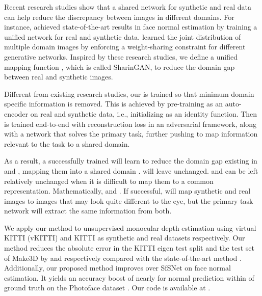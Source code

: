 \documentclass[10pt,twocolumn,letterpaper]{article}
\newcommand{\MYhref}[3][blue]{\href{#2}{\color{#1}{#3}}}
\begin{document}
Recent research studies show that a shared network for synthetic and real data can help reduce the discrepancy between images in different domains.
For instance, \cite{SfSNet} achieved state-of-the-art results in face normal estimation by training a unified network for real and synthetic data. 
\cite{CoGAN} learned the joint distribution of multiple domain images by enforcing a weight-sharing constraint for different generative networks.
Inspired by these research studies, we define a unified mapping function , which is called SharinGAN, to reduce the domain gap between real and synthetic images.


Different from existing research studies, our  is trained so that minimum domain specific information is removed.
This is achieved by pre-training  as an auto-encoder on real and synthetic data, i.e., initializing  as an identity function. Then  is trained end-to-end with reconstruction loss in an adversarial framework, along with a network that solves the primary task, further pushing  to map information relevant to the task to a shared domain.



As a result, a successfully trained  will learn to reduce the domain gap existing in  and , mapping them into a shared domain .   will leave  unchanged.    and  can be left relatively unchanged when it is difficult to map them to a common representation.
Mathematically,  and . If successful,  will map synthetic and real images to images that may look quite different to the eye, but the primary task network will extract the same information from both.






















We apply our method to unsupervised monocular depth estimation using virtual KITTI (vKITTI) \cite{vKITTI} and KITTI \cite{KITTI} as synthetic and real datasets respectively.
Our method reduces the absolute error in the KITTI eigen test split and the test set of Make3D \cite{make3D} by  and  respectively compared with the state-of-the-art method \cite{GASDA}.
Additionally, our proposed method improves over SfSNet \cite{SfSNet} on face normal estimation.  It yields an accuracy boost of nearly  for normal prediction within   of ground truth on the Photoface dataset \cite{Photoface}. Our code is available at \MYhref[magenta]{https://github.com/koutilya40192/SharinGAN}{https://github.com/koutilya40192/SharinGAN}.
\end{document}
